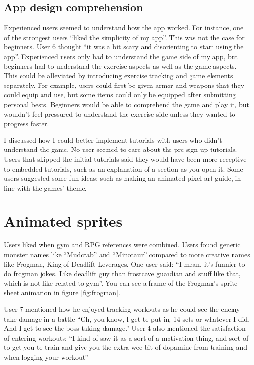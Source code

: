 \documentclass{l4proj}
\begin{document}
\subsection{App design comprehension}
Experienced users seemed to understand how the app worked. For instance, one of the strongest users ``liked the simplicity of my app''. This was not the case for beginners. User 6 thought ``it was a bit scary and disorienting to start using the app''. Experienced users only had to understand the game side of my app, but beginners had to understand the exercise aspects as well as the game aspects. This could be alleviated by introducing exercise tracking and game elements separately. For example, users could first be given armor and weapons that they could equip and use, but some items could only be equipped after submitting personal bests. Beginners would be able to comprehend the game and play it, but wouldn't feel pressured to understand the exercise side unless they wanted to progress faster. 

I discussed how I could better implement tutorials with users who didn't understand the game. No user seemed to care about the pre sign-up tutorials. Users that skipped the initial tutorials said they would have been more receptive to embedded tutorials, such as an explanation of a section as you open it. Some users suggested some fun ideas: such as making an animated pixel art guide, in-line with the games' theme.

\section{Animated sprites}
Users liked when gym and RPG references were combined. Users found generic monster names like ``Mudcrab'' and ``Minotaur'' compared to more creative names like Frogman, King of Deadlift Leverages. One user said: ``I mean, it's funnier to do frogman jokes. Like deadlift guy than frostcave guardian and stuff like that, which is not like related to gym''. You can see a frame of the Frogman's sprite sheet animation in figure \ref{fig:frogman}. 

User 7 mentioned how he enjoyed tracking workouts as he could see the enemy take damage in a battle ``Oh, you know, I get to put in, 14 sets or whatever I did. And I get to see the boss taking damage.'' User 4 also mentioned the satisfaction of entering workouts: ``I kind of saw it as a sort of a motivation thing, and sort of to get you to train and give you the extra wee bit of dopamine from training and when logging your workout''
\end{document}
